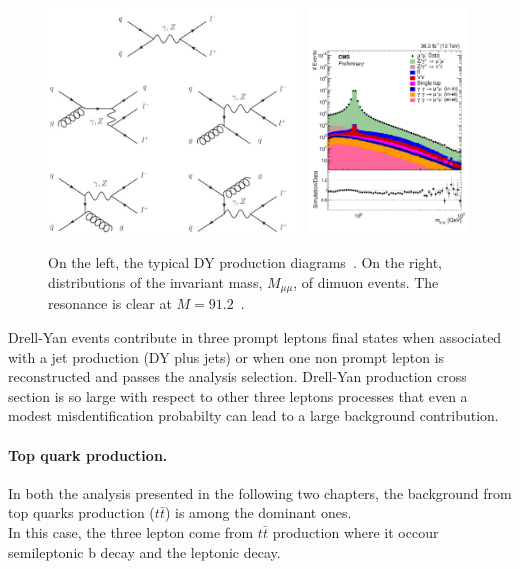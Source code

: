 \begin{figure}[h!]
\centering
  \includegraphics[height =
  6cm]{Figures/c4/dia/The-Feynman-graphs-for-Drell-Yan-pair-production-at-the-Oa-and-Oaa-s-orders_W640.jpeg}
\hspace{1cm}
  \includegraphics[height = 6cm]{Figures/c4/dia/Figure_001-a.pdf}
  \caption{On the left, the typical DY production
    diagrams~\cite{diagram}. On the right, distributions of the
    invariant mass, $M_{\mu \mu}$, of dimuon events. The \PZ resonance
    is clear at $M=91.2$\GeV~\cite{CMS-PAS-SMP-20-003}.}
  \label{fig:c44}
\end{figure}
Drell-Yan events contribute in three prompt leptons final states when
associated with a jet production (DY plus jets) or when one non prompt
lepton is reconstructed and passes the analysis selection. Drell-Yan
production cross section is so large with respect to other three
leptons processes that even a modest misdentification probabilty can
lead to a large background contribution.

\paragraph{Top quark production.}\label{sec:c4ttbar}
In both the analysis presented in the following two chapters, the
background from top quarks production ($t\bar{t}$) is among the
dominant ones. \\
In this case, the three lepton come from $t\bar{t}$ production where
it occour semileptonic b decay and the leptonic \PW decay.

